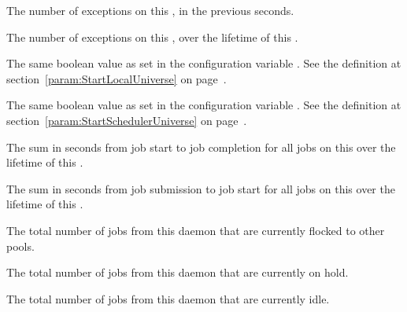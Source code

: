 \begin{description}
\item[\AdAttr{ShadowExceptions}:] The number of  exceptions 
  on this , 
  in the previous  seconds.

\item[\AdAttr{ShadowExceptionsCumulative}:] The number of  
  exceptions on this , over the lifetime of this .

\item[\AdAttr{StartLocalUniverse}:] The same boolean value as set in the
  configuration variable .
  See the definition at section~\ref{param:StartLocalUniverse} on
  page~\pageref{param:StartLocalUniverse}.

\item[\AdAttr{StartSchedulerUniverse}:] The same boolean value as set in the
  configuration variable .
  See the definition at section~\ref{param:StartSchedulerUniverse} on
  page~\pageref{param:StartSchedulerUniverse}.

\item[\AdAttr{SumRunningTimeCumulative}:] The sum in seconds
  from job start to job completion for all jobs
  on this  over the lifetime of this .

\item[\AdAttr{SumTimeToStartCumulative}:] The sum in seconds
  from job submission to job start for all jobs 
  on this  over the lifetime of this .

\item[\AdAttr{TotalFlockedJobs}:] The total number of jobs from this
   daemon that are currently flocked to other pools.

\item[\AdAttr{TotalHeldJobs}:] The total number of jobs from this
   daemon that are currently on hold.

\item[\AdAttr{TotalIdleJobs}:] The total number of jobs from this
   daemon that are currently idle.


\end{description}
